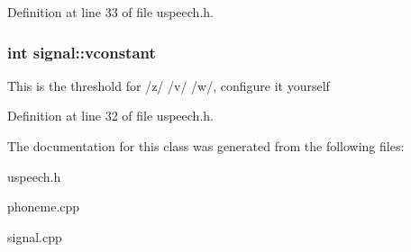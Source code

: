 Definition at line 33 of file uspeech.\-h.

\hypertarget{classsignal_ad717d6555e102392063d04affb78b95d}{
\subsubsection[{vconstant}]{\setlength{\rightskip}{0pt plus 5cm}int signal\-::vconstant}}\label{classsignal_ad717d6555e102392063d04affb78b95d}
This is the threshold for /z/ /v/ /w/, configure it yourself 

Definition at line 32 of file uspeech.\-h.



The documentation for this class was generated from the following files\-:\begin{DoxyCompactItemize}
\item 
uspeech.\-h\item 
phoneme.\-cpp\item 
signal.\-cpp\end{DoxyCompactItemize}
